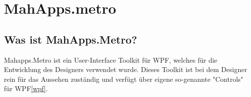 \section{MahApps.metro}
\label{mahapps}
\subsection{Was ist MahApps.Metro?}

Mahapps.Metro ist ein User-Interface Toolkit für WPF, welches für die Entwicklung des Designers verwendet wurde. Dieses Toolkit ist bei dem Designer rein für das Aussehen zuständig und verfügt über eigene so-genannte "Controls" für WPF\ref{wpf}.
